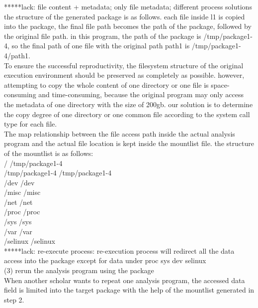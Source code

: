 \documentclass{article}
\begin{document}
*****lack: file content + metadata; only file metadata; different process solutions\\

the structure of the generated package is as follows. each file inside l1 is copied into the package, the final file path becomes the path of the package, followed by the original file path. in this program, the path of the package is /tmp/package1-4, so the final path of one file with the original path path1 is /tmp/package1-4/path1.\\

To ensure the successful reproductivity, the filesystem structure of the original execution environment should be preserved as completely as possible. however, attempting to copy the whole content of one directory or one file is space-consuming and time-consuming, because the original program may only access the metadata of one directory with the size of 200gb. our solution is to determine the copy degree of one directory or one common file according to the system call type for each file.\\

The map relationship between the file access path inside the actual analysis program and the actual file location is kept inside the mountlist file. the structure of the mountlist is as follows:\\
\indent / /tmp/package1-4 \\
\indent /tmp/package1-4 /tmp/package1-4 \\
\indent /dev /dev \\
\indent /misc /misc \\
\indent /net /net \\
\indent /proc /proc \\
\indent /sys /sys \\
\indent /var /var \\
\indent /selinux /selinux\\

*****lack: re-execute process: re-execution process will redirect all the data access into the package except for data under proc sys dev selinux\\

(3) rerun the analysis program using the package\\
\indent When another scholar wants to repeat one analysis program, the accessed data field is limited into the target package with the help of the mountlist generated in step 2. \\
\end{document}
